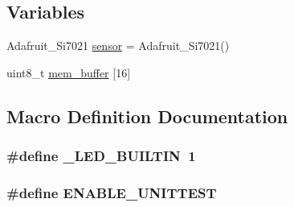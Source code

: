 \subsection*{Variables}
\begin{DoxyCompactItemize}
\item 
Adafruit\-\_\-\-Si7021 \hyperlink{OWP__DG__Si7021__thermo-hygrometer_8ino_a50492d21a4309de7228317edd9e4209c}{sensor} = Adafruit\-\_\-\-Si7021()
\item 
uint8\-\_\-t \hyperlink{OWP__DG__Si7021__thermo-hygrometer_8ino_ae2662dd0517ccab4cb98d64fedd7eec6}{mem\-\_\-buffer} \mbox{[}16\mbox{]}
\end{DoxyCompactItemize}


\subsection{Macro Definition Documentation}
\hypertarget{OWP__DG__Si7021__thermo-hygrometer_8ino_a35be658482f544255f771c4c69982391}{
\subsubsection[{\-\_\-\-L\-E\-D\-\_\-\-B\-U\-I\-L\-T\-I\-N}]{\setlength{\rightskip}{0pt plus 5cm}\#define \-\_\-\-L\-E\-D\-\_\-\-B\-U\-I\-L\-T\-I\-N~1}}\label{OWP__DG__Si7021__thermo-hygrometer_8ino_a35be658482f544255f771c4c69982391}
\hypertarget{OWP__DG__Si7021__thermo-hygrometer_8ino_a133432ca7ece04b33429e0fb94544867}{
\subsubsection[{E\-N\-A\-B\-L\-E\-\_\-\-U\-N\-I\-T\-T\-E\-S\-T}]{\setlength{\rightskip}{0pt plus 5cm}\#define E\-N\-A\-B\-L\-E\-\_\-\-U\-N\-I\-T\-T\-E\-S\-T}}\label{OWP__DG__Si7021__thermo-hygrometer_8ino_a133432ca7ece04b33429e0fb94544867}

